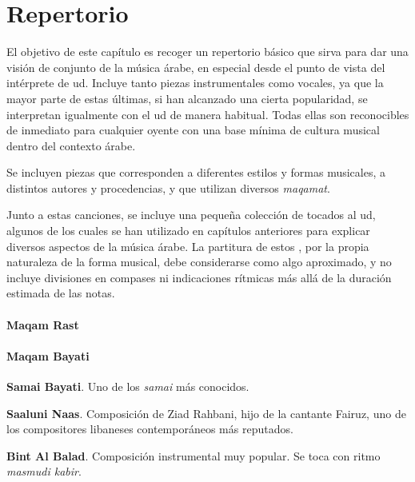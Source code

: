\chapter{Repertorio}

El objetivo de este capítulo es recoger un repertorio básico que sirva para dar una visión de conjunto de la música árabe, en especial desde el punto de vista del intérprete de ud. Incluye tanto piezas instrumentales como vocales, ya que la mayor parte de estas últimas, si han alcanzado una cierta popularidad, se interpretan igualmente con el ud de manera habitual. Todas ellas son reconocibles de inmediato para cualquier oyente con una base mínima de cultura musical dentro del contexto árabe.

Se incluyen piezas que corresponden a diferentes estilos y formas musicales, a distintos autores y procedencias, y que utilizan diversos \emph{maqamat}.

Junto a estas canciones, se incluye una pequeña colección de \taqasim tocados al ud, algunos de los cuales se han utilizado en capítulos anteriores para explicar diversos aspectos de la música árabe. La partitura de estos \taqasim, por la propia naturaleza de la forma musical, debe considerarse como algo aproximado, y no incluye divisiones en compases ni indicaciones rítmicas más allá de la duración estimada de las notas.

\subsubsection*{Maqam Rast}

\subsubsection*{Maqam Bayati}
\begin{compactitem}
\item \textbf{Samai Bayati}. Uno de los \emph{samai} más conocidos.
\item \textbf{Saaluni Naas}. Composición de Ziad Rahbani, hijo de la cantante Fairuz, uno de los compositores libaneses contemporáneos más reputados.
\item \textbf{Bint Al Balad}. Composición instrumental muy popular. Se toca con ritmo \emph{masmudi kabir}.
\end{compactitem}

